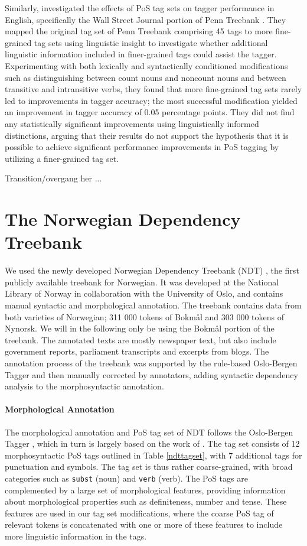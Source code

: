 \documentclass[11pt,a4paper]{article}
\begin{document}
Similarly,  investigated the effects of PoS tag sets on tagger
performance in English, specifically the Wall Street Journal portion of Penn
Treebank \cite{Mar:San:Mar:93}. They mapped the original tag set of Penn
Treebank comprising 45 tags to more fine-grained tag sets using linguistic
insight to investigate whether additional linguistic information included in
finer-grained tags could assist the tagger. Experimenting with both lexically
and syntactically conditioned modifications such as distinguishing between
count nouns and noncount nouns and between transitive and intransitive verbs,
they found that more fine-grained tag sets rarely led to improvements in tagger
accuracy; the most successful modification yielded an improvement in tagger
accuracy of 0.05 percentage points.  They did not find any statistically
significant improvements using linguistically informed distinctions, arguing
that their results do not support the hypothesis that it is possible to achieve
significant performance improvements in PoS tagging by utilizing a
finer-grained tag set.

Transition/overgang her ...

\section{The Norwegian Dependency Treebank}
\label{sec:data}
We used the newly developed Norwegian Dependency Treebank (NDT)
\cite{Sol:Skj:Ovr:14}, the first publicly available treebank for
Norwegian. It was developed at the National Library of Norway in
collaboration with the University of Oslo, and contains manual
syntactic and morphological annotation. The treebank contains data
from both varieties of Norwegian; 311 000 tokens of Bokmål and 303 000
tokens of Nynorsk. We will in the following only be using the Bokmål
portion of the treebank. The annotated texts are mostly newspaper
text, but also include government reports, parliament transcripts and
excerpts from blogs. The annotation process of the treebank was supported by
the rule-based Oslo-Bergen Tagger \cite{Hag:Joh:Nok:00} and then manually
corrected by annotators, adding syntactic dependency analysis to the
morphosyntactic annotation.

\paragraph{Morphological Annotation}
The morphological annotation and PoS tag set of NDT follows the Oslo-Bergen
Tagger \cite{Hag:Joh:Nok:00,Sol:13}, which in turn is largely based on the work
of . The tag set consists of 12 morphosyntactic PoS
tags outlined in Table \ref{ndttagset}, with 7 additional tags for punctuation
and symbols. The tag set is thus rather coarse-grained, with broad categories
such as \texttt{subst} (noun) and \texttt{verb} (verb). The PoS tags are
complemented by a large set of morphological features, providing information
about morphological properties such as definiteness, number and tense. These
features are used in our tag set modifications, where the coarse PoS tag of
relevant tokens is concatenated with one or more of these features to include
more linguistic information in the tags.
\end{document}
